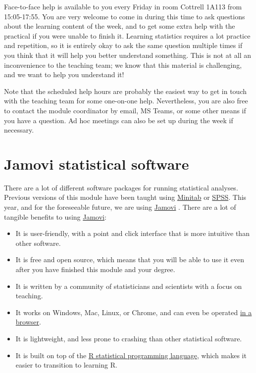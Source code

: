 \documentclass[
]{scrbook}
\providecommand{\tightlist}{%
  \setlength{\itemsep}{0pt}\setlength{\parskip}{0pt}}
\begin{document}
Face-to-face help is available to you every Friday in room Cottrell 1A113 from 15:05-17:55.
You are very welcome to come in during this time to ask questions about the learning content of the week, and to get some extra help with the practical if you were unable to finish it.
Learning statistics requires a lot practice and repetition, so it is entirely okay to ask the same question multiple times if you think that it will help you better understand something.
This is not at all an inconvenience to the teaching team; we know that this material is challenging, and we want to help you understand it!

Note that the scheduled help hours are probably the easiest way to get in touch with the teaching team for some one-on-one help.
Nevertheless, you are also free to contact the module coordinator by email, MS Teams, or some other means if you have a question.
Ad hoc meetings can also be set up during the week if necessary.

\hypertarget{jamovi}{%
\section*{Jamovi statistical software}\label{jamovi}}

There are a lot of different software packages for running statistical analyses.
Previous versions of this module have been taught using \href{https://www.minitab.com/en-us/}{Minitab} or \href{https://www.ibm.com/uk-en/products/spss-statistics}{SPSS}.
This year, and for the foreseeable future, we are using \href{https://www.jamovi.org/}{Jamovi} \citep{Jamovi2022}.
There are a lot of tangible benefits to using \href{https://www.jamovi.org/}{Jamovi}:

\begin{itemize}
\tightlist
\item
  It is user-friendly, with a point and click interface that is more intuitive than other software.
\item
  It is free and open source, which means that you will be able to use it even after you have finished this module and your degree.
\item
  It is written by a community of statisticians and scientists with a focus on teaching.
\item
  It works on Windows, Mac, Linux, or Chrome, and can even be operated \href{https://www.jamovi.org/cloud.html}{in a browser}.
\item
  It is lightweight, and less prone to crashing than other statistical software.
\item
  It is built on top of the \href{https://www.r-project.org/about.html}{R statistical programming language}, which makes it easier to transition to learning R.
\end{itemize}
\end{document}

